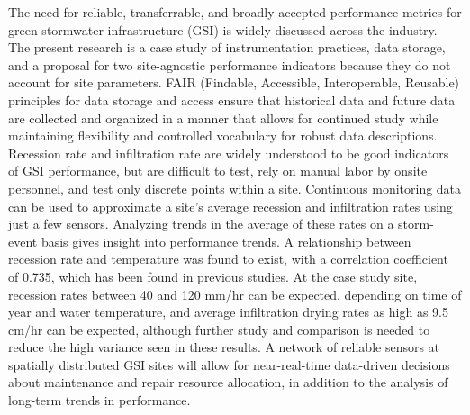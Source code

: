 %

\label{sec:abstract}

The need for reliable, transferrable, and broadly accepted performance metrics for green stormwater infrastructure (GSI) is widely discussed across the industry.
The present research is a case study of instrumentation practices, data storage, and a proposal for two site-agnostic performance indicators because they do not account for site parameters.
FAIR (Findable, Accessible, Interoperable, Reusable) principles for data storage and access ensure that historical data and future data are collected and organized in a manner that allows for continued study while maintaining flexibility and controlled vocabulary for robust data descriptions.
Recession rate and infiltration rate are widely understood to be good indicators of GSI performance, but are difficult to test, rely on manual labor by onsite personnel, and test only discrete points within a site.
Continuous monitoring data can be used to approximate a site's average recession and infiltration rates using just a few sensors.
Analyzing trends in the average of these rates on a storm-event basis gives insight into performance trends.
A relationship between recession rate and temperature was found to exist, with a correlation coefficient of 0.735, which has been found in previous studies.
At the case study site, recession rates between 40 and 120 mm/hr can be expected, depending on time of year and water temperature, and average infiltration drying rates as high as 9.5 cm/hr can be expected, although further study and comparison is needed to reduce the high variance seen in these results.
A network of reliable sensors at spatially distributed GSI sites will allow for near-real-time data-driven decisions about maintenance and repair resource allocation, in addition to the analysis of long-term trends in performance.

